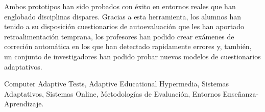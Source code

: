 \begin{abstractEs}
Ambos prototipos han sido probados con éxito en entornos reales que han englobado disciplinas dispares. Gracias a esta herramienta, los alumnos han tenido a su disposición cuestionarios de autoevaluación que les han aportado retroalimentación temprana, los profesores han podido crear exámenes de correción automática en los que han detectado rapidamente errores y, también, un conjunto de investigadores han podido probar nuevos modelos de cuestionarios adaptativos.

\end{abstractEs}

\begin{keywordsEs}
Computer Adaptive Tests, Adaptive Educational Hypermedia, Sistemas Adaptativos, Sistemas Online, Metodologías de Evaluación, Entornos Enseñanza-Aprendizaje.
\end{keywordsEs}